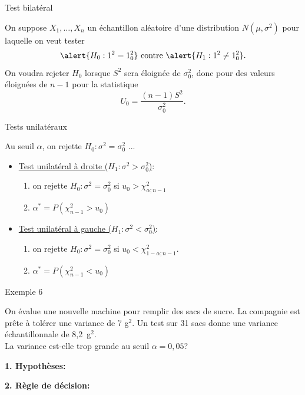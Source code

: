 \documentclass{BeamerTemplate}
\begin{document}
\begin{frame}[t]{Test bilatéral}

On suppose $X_1, \ldots, X_n$ un échantillon aléatoire d'une distribution $N(\mu, \sigma^2)$
pour laquelle on veut tester $$\alert{H_0 : \sigma^2 = \sigma_0^2} \mbox{ contre } \alert{H_1 : \sigma^2 \ne \sigma_0^2}.$$
On voudra rejeter $H_0$ lorsque $S^2$ sera éloignée de $\sigma^2_0$, donc pour des valeurs éloignées de $n-1$ pour la statistique
$$U_0 = \frac{(n-1)S^2}{\sigma_0^2}. $$

\end{frame}

\begin{frame}[t]{Tests unilatéraux}

{\small
Au seuil $\alpha$, on rejette $H_0:\sigma^2 = \sigma_0^2$ ...
\begin{itemize}

\item \underline{Test unilatéral à droite ($H_1 : \sigma^2 > \sigma_0^2$)}:

    \begin{enumerate}[$\circ$]\itemsep2mm
    \item on rejette $H_0 : \sigma^2 = \sigma_0^2$  si $u_0>\chi^2_{\alpha;n-1}$
    \item $\alpha^*=P(\chi^2_{n-1}>u_0)$
    \end{enumerate}

\item \underline{Test unilatéral à gauche ($H_1 : \sigma^2 < \sigma_0^2$)}:

    \begin{enumerate}[$\circ$]\itemsep2mm
    \item on rejette $H_0 : \sigma^2 = \sigma_0^2$ si $u_0<\chi^2_{1-\alpha;n-1}$.
    \item $\alpha^*=P(\chi^2_{n-1}<u_0)$
    \end{enumerate}
\end{itemize}
}
\end{frame}


\begin{frame}[t]{Exemple 6}

On évalue une nouvelle machine pour remplir des sacs de sucre. La compagnie est prête à tolérer une variance de 7 g$^2$. 
Un test sur 31 sacs donne une variance échantillonnale de \mbox{8,2 g$^2$.} \\La variance est-elle trop grande au seuil \mbox{$\alpha = 0,05$?}



\bigskip

{\bf 1. Hypothèses:}
\vspace{1cm}

{\bf 2. Règle de décision:}

\end{frame}
\end{document}
